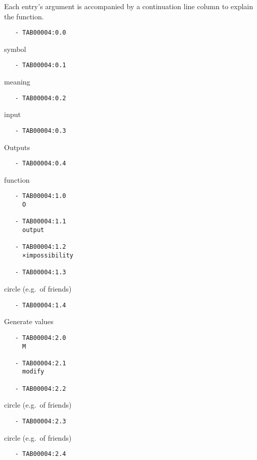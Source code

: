 Each entry's argument is accompanied by a continuation line column to
explain the function.

\begin{verbatim}
   - TAB00004:0.0 
\end{verbatim}

symbol

\begin{verbatim}
   - TAB00004:0.1 
\end{verbatim}

meaning

\begin{verbatim}
   - TAB00004:0.2 
\end{verbatim}

input

\begin{verbatim}
   - TAB00004:0.3 
\end{verbatim}

Outputs

\begin{verbatim}
   - TAB00004:0.4 
\end{verbatim}

function

\begin{verbatim}
   - TAB00004:1.0 
     O
 
   - TAB00004:1.1 
     output
 
   - TAB00004:1.2 
     ×impossibility
 
   - TAB00004:1.3 
\end{verbatim}

circle (e.g.~of friends)

\begin{verbatim}
   - TAB00004:1.4 
\end{verbatim}

Generate values

\begin{verbatim}
   - TAB00004:2.0 
     M
 
   - TAB00004:2.1 
     modify
 
   - TAB00004:2.2 
\end{verbatim}

circle (e.g.~of friends)

\begin{verbatim}
   - TAB00004:2.3 
\end{verbatim}

circle (e.g.~of friends)

\begin{verbatim}
   - TAB00004:2.4 
\end{verbatim}

